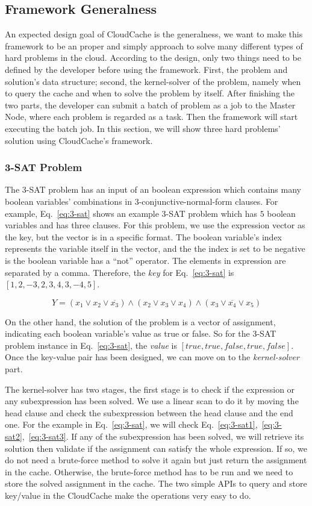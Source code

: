 \subsection{Framework Generalness}
An expected design goal of CloudCache is the generalness, we want to make this framework to be an proper and simply approach to solve many different types of hard problems in the cloud. According to the design, only two things need to be defined by the developer before using the framework. First, the problem and solution's data structure; second, the kernel-solver of the problem, namely when to query the cache and when to solve the problem by itself. After finishing the two parts, the developer can submit a batch of problem as a job to the Master Node, where each problem is regarded as a task. Then the framework will start executing the batch job. In this section, we will show three hard problems' solution using CloudCache's framework.

\subsubsection{3-SAT Problem}
The 3-SAT problem has an input of an boolean expression which contains many boolean variables' combinations in 3-conjunctive-normal-form clauses. For example, Eq.~\ref{eq:3-sat} shows an example 3-SAT problem which has $5$ boolean variables and has three clauses. For this problem, we use the expression vector as the key, but the vector is in a specific format. The boolean variable's index represents the variable itself in the vector, and the the index is set to be negative is the boolean variable has a ``not'' operator. The elements in expression are separated by a comma. Therefore, the \emph{key} for Eq.~\ref{eq:3-sat} is $[1,2,-3,2,3,4,3,-4,5]$.

\begin{equation}
Y = (x_1 \vee x_2 \vee \overline{x_3}) \wedge (x_2 \vee x_3 \vee x_4) \wedge (x_3 \vee \overline{x_4} \vee x_5)
\label{eq:3-sat}
\end{equation}

On the other hand, the solution of the problem is a vector of assignment, indicating each boolean variable's value as true or false. So for the 3-SAT problem instance in Eq.~\ref{eq:3-sat}, the \emph{value} is $[true, true, false, true, false]$. Once the key-value pair has been designed, we can move on to the \emph{kernel-solver} part.

The kernel-solver has two stages, the first stage is to check if the expression or any subexpression has been solved. We use a linear scan to do it by moving the head clause and check the subexpression between the head clause and the end one. For the example in Eq.~\ref{eq:3-sat}, we will check Eq.~\ref{eq:3-sat1},~\ref{eq:3-sat2},~\ref{eq:3-sat3}. If any of the subexpression has been solved, we will retrieve its solution then validate if the assignment can satisfy the whole expression. If so, we do not need a brute-force method to solve it again but just return the assignment in the cache. Otherwise, the brute-force method has to be run and we need to store the solved assignment in the cache. The two simple APIs to query and store key/value in the CloudCache make the operations very easy to do.

